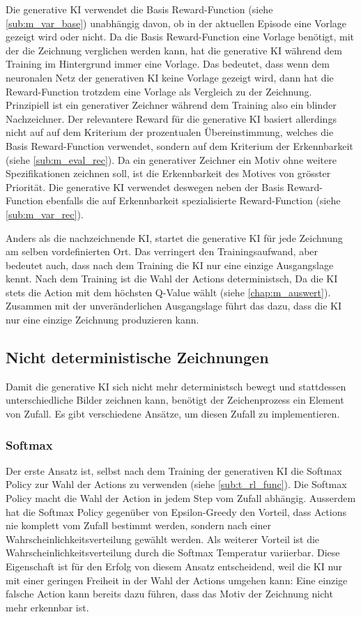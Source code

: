 Die generative KI verwendet die Basis Reward-Function (siehe
\ref{sub:m_var_base}) unabhängig davon, ob in der aktuellen Episode eine
Vorlage gezeigt wird oder nicht. Da die Basis Reward-Function eine Vorlage
benötigt, mit der die Zeichnung verglichen werden kann, hat die generative KI
während dem Training im Hintergrund immer eine Vorlage. Das bedeutet, dass wenn
dem neuronalen Netz der generativen KI keine Vorlage gezeigt wird, dann hat die
Reward-Function trotzdem eine Vorlage als Vergleich zu der Zeichnung.
Prinzipiell ist ein generativer Zeichner während dem Training also ein blinder
Nachzeichner. Der relevantere Reward für die generative KI basiert allerdings
nicht auf auf dem Kriterium der prozentualen Übereinstimmung, welches die Basis
Reward-Function verwendet, sondern auf dem Kriterium der Erkennbarkeit (siehe
\ref{sub:m_eval_rec}). Da ein generativer Zeichner ein Motiv ohne weitere
Spezifikationen zeichnen soll, ist die Erkennbarkeit des Motives von grösster
Priorität. Die generative KI verwendet deswegen neben der Basis Reward-Function
ebenfalls die auf Erkennbarkeit spezialisierte Reward-Function (siehe
\ref{sub:m_var_rec}). 

Anders als die nachzeichnende KI, startet die generative KI für jede Zeichnung
am selben vordefinierten Ort. Das verringert den Trainingsaufwand, aber bedeutet
auch, dass nach dem Training die KI nur eine einzige Ausgangslage kennt. Nach
dem Training ist die Wahl der Actions deterministsch, Da die KI stets die Action
mit dem höchsten Q-Value wählt (siehe \ref{chap:m_auswert}). Zusammen mit
der unveränderlichen Ausgangslage führt das dazu, dass die KI nur eine einzige
Zeichnung produzieren kann. 


\subsection{Nicht deterministische Zeichnungen}\label{sub:m_gen_det} Damit die
generative KI sich nicht mehr deterministsch bewegt und stattdessen
unterschiedliche Bilder zeichnen kann, benötigt der Zeichenprozess ein Element
von Zufall. Es gibt verschiedene Ansätze, um diesen Zufall zu implementieren.

\subsubsection*{Softmax}

Der erste Ansatz ist, selbst nach dem Training der generativen KI die Softmax
Policy zur Wahl der Actions zu verwenden (siehe \ref{sub:t_rl_func}). Die
Softmax Policy macht die Wahl der Action in jedem Step vom Zufall abhängig.
Ausserdem hat die Softmax Policy gegenüber von Epsilon-Greedy den Vorteil, dass
Actions nie komplett vom Zufall bestimmt werden, sondern nach einer
Wahrscheinlichkeitsverteilung gewählt werden. Als weiterer Vorteil ist die
Wahrscheinlichkeitsverteilung durch die Softmax Temperatur variierbar. Diese
Eigenschaft ist für den Erfolg von diesem Ansatz entscheidend, weil die KI nur
mit einer geringen Freiheit in der Wahl der Actions umgehen kann: Eine einzige
falsche Action kann bereits dazu führen, dass das Motiv der Zeichnung nicht mehr
erkennbar ist. 

